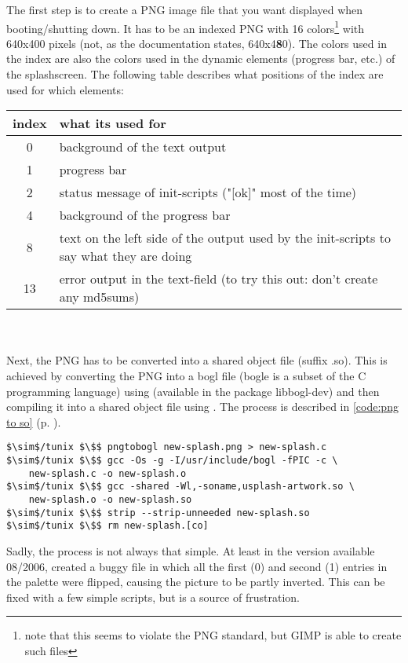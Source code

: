 The first step is to create a PNG image file that you want displayed when
booting/shutting down. It has to be an indexed PNG with 16 colors\footnote{note
that this seems to violate the PNG standard, but GIMP is able to create such
files} with 640x400 pixels (not, as the documentation states, 640x4\textbf{8}0).
The colors used in the index are also the colors used in the dynamic elements
(progress bar, etc.) of the splashscreen. The following table describes what
positions of the index are used for which elements:\\

\begin{tabular}[ht]{|c|p{11cm}|}
\hline
\textbf{index} & \textbf{what its used for} \\ \hline
0 & background of the text output \\ \hline
1 & progress bar \\ \hline
2 & status message of init-scripts ("[ok]" most of the time) \\ \hline
4 & background of the progress bar \\ \hline
8 & text on the left side of the output used by the init-scripts to say what
they are doing \\ \hline
13 & error output in the text-field (to try this out: don't create any md5sums)
\\ \hline
\end{tabular}\\\\

Next, the PNG has to be converted into a shared object file (suffix .so). This
is achieved by converting the PNG into a bogl file (bogle is a subset of the C
programming language) using  (available in the package
libbogl-dev) and then compiling it into a shared object file using .
The process is described in \lstlistingname{} \ref{code:png to so} (p.
\pageref{code:png to so}).
\begin{lstlisting}[float=ht,label=code:png to so,caption=Converting a PNG to a
shared object]
$\sim$/tunix $\$$ pngtobogl new-splash.png > new-splash.c 
$\sim$/tunix $\$$ gcc -Os -g -I/usr/include/bogl -fPIC -c \
	new-splash.c -o new-splash.o
$\sim$/tunix $\$$ gcc -shared -Wl,-soname,usplash-artwork.so \
	new-splash.o -o new-splash.so
$\sim$/tunix $\$$ strip --strip-unneeded new-splash.so
$\sim$/tunix $\$$ rm new-splash.[co]
\end{lstlisting}

Sadly, the process is not always that simple. At least in the version available
08/2006,  created a buggy file in which all the first (0) and second
(1) entries in the palette were flipped, causing the picture to be partly inverted.
This can be fixed with a few simple \cmd{sed} scripts, but is a source of
frustration.

